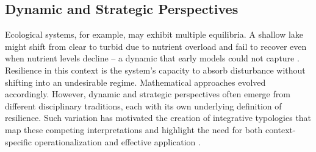 \subsection{Dynamic and Strategic Perspectives}
\label{appendix:A3}

Ecological systems, for example, may exhibit multiple equilibria. A shallow lake might shift from clear to turbid due to nutrient overload and fail to recover even when nutrient levels decline -- a dynamic that early models could not capture \autocite{holling1973resilience}. Resilience in this context is the system’s capacity to absorb disturbance without shifting into an undesirable regime. Mathematical approaches evolved accordingly. However, dynamic and strategic perspectives often emerge from different disciplinary traditions, each with its own underlying definition of resilience. Such variation has motivated the creation of integrative typologies that map these competing interpretations and highlight the need for both context-specific operationalization and effective application \autocite{meerow2016defining}.\\

